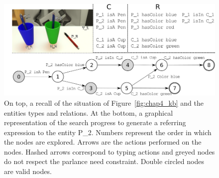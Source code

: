 \begin{figure}[ht!]
\centering
\includegraphics[scale=0.45]{figures/chapter4/search.png}
\caption{\label{fig:chap4_search} On top, a recall of the situation of Figure~\ref{fig:chap4_kb} and the entities types and relations.
At the bottom, a graphical representation of the search progress to generate a referring expression to the entity P\_2. Numbers represent the order in which the nodes are explored. Arrows are the actions performed on the nodes. Hashed arrows correspond to typing actions and greyed nodes do not respect the parlance need constraint. Double circled nodes are valid nodes. }
\end{figure}

